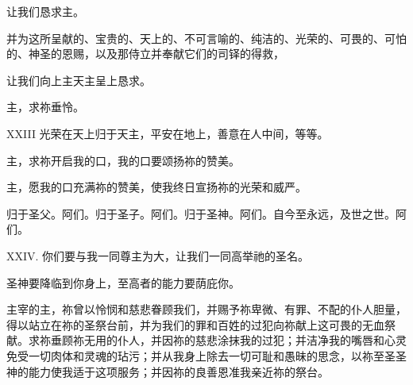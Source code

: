 让我们恳求主。\par

并为这所呈献的、宝贵的、天上的、不可言喻的、纯洁的、光荣的、可畏的、可怕的、神圣的恩赐，以及那侍立并奉献它们的司铎的得救，\par

让我们向上主天主呈上恳求。\par

\par

主，求祢垂怜。\par

\par

\par

XXIII 光荣在天上归于天主，平安在地上，善意在人中间，等等。\par

\par

主，求祢开启我的口，我的口要颂扬祢的赞美。\par

\par

主，愿我的口充满祢的赞美，使我终日宣扬祢的光荣和威严。\par

\par

归于圣父。阿们。归于圣子。阿们。归于圣神。阿们。自今至永远，及世之世。阿们。\par

\par

XXIV. 你们要与我一同尊主为大，让我们一同高举祂的圣名。\par

\par

圣神要降临到你身上，至高者的能力要荫庇你。\par

\par

主宰的主，祢曾以怜悯和慈悲眷顾我们，并赐予祢卑微、有罪、不配的仆人胆量，得以站立在祢的圣祭台前，并为我们的罪和百姓的过犯向祢献上这可畏的无血祭献。求祢垂顾祢无用的仆人，并因祢的慈悲涂抹我的过犯；并洁净我的嘴唇和心灵免受一切肉体和灵魂的玷污；并从我身上除去一切可耻和愚昧的思念，以祢至圣圣神的能力使我适于这项服务；并因祢的良善恩准我亲近祢的祭台。\par


